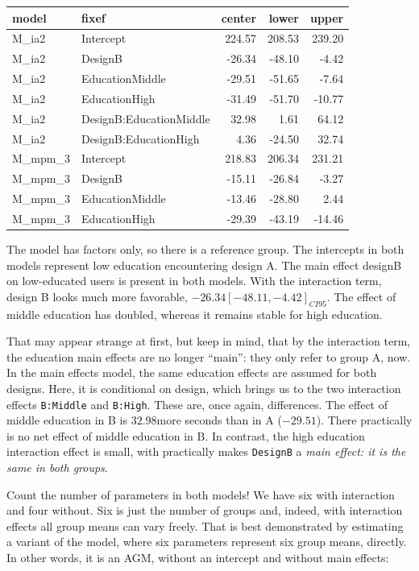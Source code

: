 \documentclass[]{svmono}
\newenvironment{Shaded}{\begin{snugshade}}{\end{snugshade}}
\newcommand{\KeywordTok}[1]{\textcolor[rgb]{0.13,0.29,0.53}{\textbf{#1}}}
\newcommand{\DataTypeTok}[1]{\textcolor[rgb]{0.13,0.29,0.53}{#1}}
\newcommand{\DecValTok}[1]{\textcolor[rgb]{0.00,0.00,0.81}{#1}}
\newcommand{\StringTok}[1]{\textcolor[rgb]{0.31,0.60,0.02}{#1}}
\newcommand{\CommentTok}[1]{\textcolor[rgb]{0.56,0.35,0.01}{\textit{#1}}}
\newcommand{\OperatorTok}[1]{\textcolor[rgb]{0.81,0.36,0.00}{\textbf{#1}}}
\newcommand{\NormalTok}[1]{#1}
\begin{document}
\begin{longtable}[]{@{}llrrr@{}}
\toprule
model & fixef & center & lower & upper\tabularnewline
\midrule
\endhead
M\_ia2 & Intercept & 224.57 & 208.53 & 239.20\tabularnewline
M\_ia2 & DesignB & -26.34 & -48.10 & -4.42\tabularnewline
M\_ia2 & EducationMiddle & -29.51 & -51.65 & -7.64\tabularnewline
M\_ia2 & EducationHigh & -31.49 & -51.70 & -10.77\tabularnewline
M\_ia2 & DesignB:EducationMiddle & 32.98 & 1.61 & 64.12\tabularnewline
M\_ia2 & DesignB:EducationHigh & 4.36 & -24.50 & 32.74\tabularnewline
M\_mpm\_3 & Intercept & 218.83 & 206.34 & 231.21\tabularnewline
M\_mpm\_3 & DesignB & -15.11 & -26.84 & -3.27\tabularnewline
M\_mpm\_3 & EducationMiddle & -13.46 & -28.80 & 2.44\tabularnewline
M\_mpm\_3 & EducationHigh & -29.39 & -43.19 & -14.46\tabularnewline
\bottomrule
\end{longtable}

The model has factors only, so there is a reference group. The
intercepts in both models represent low education encountering design A.
The main effect designB on low-educated users is present in both models.
With the interaction term, design B looks much more favorable,
\(-26.34 [-48.11, -4.42]_{CI95}\). The effect of middle education has
doubled, whereas it remains stable for high education.

That may appear strange at first, but keep in mind, that by the
interaction term, the education main effects are no longer ``main'':
they only refer to group A, now. In the main effects model, the same
education effects are assumed for both designs. Here, it is conditional
on design, which brings us to the two interaction effects
\texttt{B:Middle} and \texttt{B:High}. These are, once again,
differences. The effect of middle education in B is \(32.98\)more
seconds than in A (\(-29.51\)). There practically is no net effect of
middle education in B. In contrast, the high education interaction
effect is small, with practically makes \texttt{DesignB} a \emph{main
effect: it is the same in both groups}.

Count the number of parameters in both models! We have six with
interaction and four without. Six is just the number of groups and,
indeed, with interaction effects all group means can vary freely. That
is best demonstrated by estimating a variant of the model, where six
parameters represent six group means, directly. In other words, it is an
AGM, without an intercept and without main effects:

\begin{Shaded}
\end{Shaded}
\end{document}
